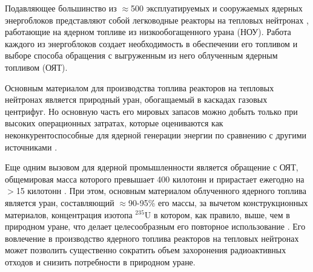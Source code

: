 {\actuality}

Подавляющее большинство из $\approx$500 эксплуатируемых и сооружаемых ядерных энергоблоков представляют собой легководные реакторы на тепловых нейтронах \cite{PRISHome}, работающие на ядерном топливе из низкообогащенного урана (НОУ). Работа каждого из энергоблоков создает необходимость в обеспечении его топливом и выборе способа обращения с выгруженным из него облученным ядерным топливом (ОЯТ).

Основным материалом для производства топлива реакторов на тепловых нейтронах является природный уран, обогащаемый в каскадах газовых центрифуг. Но основную часть его мировых запасов можно добыть только при высоких операционных затратах, которые оцениваются как неконкурентоспособные для ядерной генерации энергии по сравнению с другими источниками \cite{Uranium2022,WorldDistributionUranium2018,hartardCompetitionConflictsResource2015}. 

Еще одним вызовом для ядерной промышленности является обращение с ОЯТ, общемировая масса которого превышает 400 килотонн и прирастает ежегодно на $>$15 килотонн \cite{kaygorodcevProblemyPerspektivyRazvitiya2021,UseReprocessedUranium2020WNA}. При этом, основным материалом облученного ядерного топлива является уран, составляющий $\approx$90-95\% его массы, за вычетом конструкционных материалов, концентрация изотопа $^{235}$U в котором, как правило, выше, чем в природном уране, что делает целесообразным его повторное использование \cite{24NikipelovNikipelovSudby}. Его вовлечение в производство ядерного топлива реакторов на тепловых нейтронах может позволить существенно сократить объем захоронения радиоактивных отходов и снизить потребности в природном уране.

